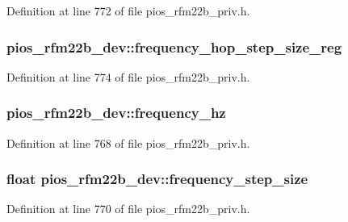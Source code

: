 Definition at line 772 of file pios\-\_\-rfm22b\-\_\-priv.\-h.

\hypertarget{structpios__rfm22b__dev_a2ac3d7ab6d15ced50a36ffc03275b5ea}{
\subsubsection[{frequency\-\_\-hop\-\_\-step\-\_\-size\-\_\-reg}]{ pios\-\_\-rfm22b\-\_\-dev\-::frequency\-\_\-hop\-\_\-step\-\_\-size\-\_\-reg}}\label{structpios__rfm22b__dev_a2ac3d7ab6d15ced50a36ffc03275b5ea}


Definition at line 774 of file pios\-\_\-rfm22b\-\_\-priv.\-h.

\hypertarget{structpios__rfm22b__dev_a1b85d9c8c4c8dc7ebb1449ce2febee0e}{
\subsubsection[{frequency\-\_\-hz}]{ pios\-\_\-rfm22b\-\_\-dev\-::frequency\-\_\-hz}}\label{structpios__rfm22b__dev_a1b85d9c8c4c8dc7ebb1449ce2febee0e}


Definition at line 768 of file pios\-\_\-rfm22b\-\_\-priv.\-h.

\hypertarget{structpios__rfm22b__dev_a8cc9611e61bcaf29852b83cffa87ccd6}{
\subsubsection[{frequency\-\_\-step\-\_\-size}]{\setlength{\rightskip}{0pt plus 5cm}float pios\-\_\-rfm22b\-\_\-dev\-::frequency\-\_\-step\-\_\-size}}\label{structpios__rfm22b__dev_a8cc9611e61bcaf29852b83cffa87ccd6}


Definition at line 770 of file pios\-\_\-rfm22b\-\_\-priv.\-h.

